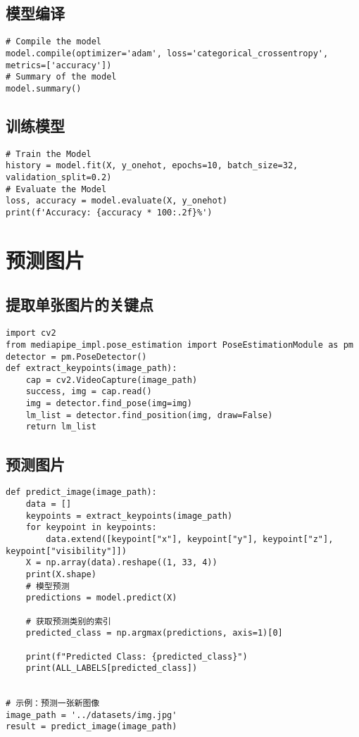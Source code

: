 \subsection{模型编译}

\begin{lstlisting}
# Compile the model
model.compile(optimizer='adam', loss='categorical_crossentropy', metrics=['accuracy'])
# Summary of the model
model.summary()
\end{lstlisting}

\subsection{训练模型}

\begin{lstlisting}
# Train the Model
history = model.fit(X, y_onehot, epochs=10, batch_size=32, validation_split=0.2)
# Evaluate the Model
loss, accuracy = model.evaluate(X, y_onehot)
print(f'Accuracy: {accuracy * 100:.2f}%')
\end{lstlisting}

\section{预测图片}

\subsection{提取单张图片的关键点}

\begin{lstlisting}
import cv2
from mediapipe_impl.pose_estimation import PoseEstimationModule as pm
detector = pm.PoseDetector()
def extract_keypoints(image_path):
    cap = cv2.VideoCapture(image_path)
    success, img = cap.read()
    img = detector.find_pose(img=img)
    lm_list = detector.find_position(img, draw=False)
    return lm_list
\end{lstlisting}

\subsection{预测图片}

\begin{lstlisting}
def predict_image(image_path):
    data = []
    keypoints = extract_keypoints(image_path)
    for keypoint in keypoints:
        data.extend([keypoint["x"], keypoint["y"], keypoint["z"], keypoint["visibility"]])
    X = np.array(data).reshape((1, 33, 4))
    print(X.shape)
    # 模型预测
    predictions = model.predict(X)

    # 获取预测类别的索引
    predicted_class = np.argmax(predictions, axis=1)[0]

    print(f"Predicted Class: {predicted_class}")
    print(ALL_LABELS[predicted_class])


# 示例：预测一张新图像
image_path = '../datasets/img.jpg'
result = predict_image(image_path)
\end{lstlisting}

